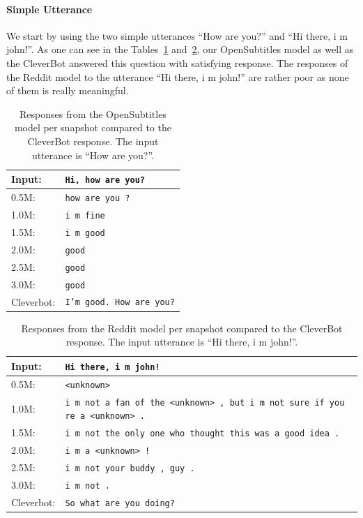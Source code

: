 \paragraph{Simple Utterance} We start by using the two simple utterances ``How are you?'' and ``Hi there, i m john!''. As one can see in the Tables~\ref{results:example1_output:OpenSubtitle_compared} and~\ref{results:example1_output:Reddit_compared}, our OpenSubtitles model as well as the CleverBot answered this question with satisfying response. The responses of the Reddit model to the utterance ``Hi there, i m john!'' are rather poor as none of them is really meaningful.
\\
\begin{table}[H]
	\centering
	\begin{adjustbox}{max width=\textwidth}
		\begin{tabularx}{\textwidth}{lX}
			\toprule
			Input: 	& \texttt{Hi, how are you?}\\
			\midrule
			0.5M: 	& \texttt{how are you ?}\\
			1.0M: 	& \texttt{i m fine}\\
			1.5M:	& \texttt{i m good}\\
			2.0M:	& \texttt{good}\\
			2.5M:	& \texttt{good}\\
			3.0M:	& \texttt{good}\\
			Cleverbot:	& \texttt{I'm good. How are you?}\\
			\bottomrule
		\end{tabularx}
	\end{adjustbox}
\caption{Responses from the OpenSubtitles model per snapshot compared to the CleverBot response. The input utterance is ``How are you?''.}
\label{results:example1_output:OpenSubtitle_compared}

\end{table}
\begin{table}[H]
	\centering
	\begin{adjustbox}{max width=\textwidth}
		\begin{tabularx}{\textwidth}{lX}
			\toprule
			Input: 	& \texttt{Hi there, i m john!}\\
			\midrule
			0.5M:	& \texttt{<unknown>}\\
			1.0M: 	& \texttt{i m not a fan of the <unknown> , but i m not sure if you re a <unknown> .}\\
			1.5M: 	& \texttt{i m not the only one who thought this was a good idea .}\\
			2.0M:	& \texttt{i m a <unknown> !}\\
			2.5M:	& \texttt{i m not your buddy , guy .}\\
			3.0M:	& \texttt{i m not .}\\
			Cleverbot:	& \texttt{So what are you doing?}\\
			\bottomrule
		\end{tabularx}
	\end{adjustbox}
	\caption{Responses from the Reddit model per snapshot compared to the CleverBot response. The input utterance is ``Hi there, i m john!''.}
	\label{results:example1_output:Reddit_compared}
\end{table}

